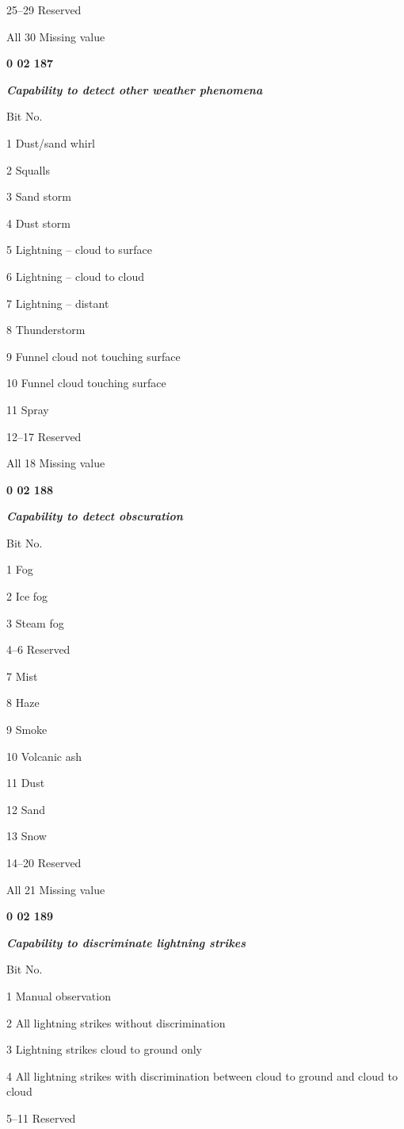 25--29 Reserved

All 30 Missing value

\textbf{0 02 187}

\emph{\textbf{Capability to detect other weather phenomena}}

Bit No.

1 Dust/sand whirl

2 Squalls

3 Sand storm

4 Dust storm

5 Lightning -- cloud to surface

6 Lightning -- cloud to cloud

7 Lightning -- distant

8 Thunderstorm

9 Funnel cloud not touching surface

10 Funnel cloud touching surface

11 Spray

12--17 Reserved

All 18 Missing value

\textbf{0 02 188}

\emph{\textbf{Capability to detect obscuration}}

Bit No.

1 Fog

2 Ice fog

3 Steam fog

4--6 Reserved

7 Mist

8 Haze

9 Smoke

10 Volcanic ash

11 Dust

12 Sand

13 Snow

14--20 Reserved

All 21 Missing value

\textbf{0 02 189}

\emph{\textbf{Capability to discriminate lightning strikes}}

Bit No.

1 Manual observation

2 All lightning strikes without discrimination

3 Lightning strikes cloud to ground only

4 All lightning strikes with discrimination between cloud to ground and cloud to cloud

5--11 Reserved

